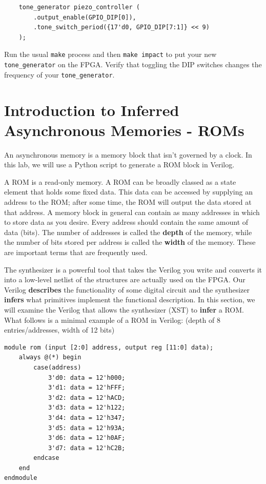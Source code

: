 \documentclass[11pt]{article}
\begin{document}
\begin{verbatim}
	tone_generator piezo_controller (
		.output_enable(GPIO_DIP[0]),
		.tone_switch_period({17'd0, GPIO_DIP[7:1]} << 9)
	);
\end{verbatim}

Run the usual \verb|make| process and then \verb|make impact| to put your new \verb|tone_generator| on the FPGA. Verify that toggling the DIP switches changes the frequency of your \verb|tone_generator|. 

\section{Introduction to Inferred Asynchronous Memories - ROMs}
An asynchronous memory is a memory block that isn't governed by a clock. In this lab, we will use a Python script to generate a ROM block in Verilog.

A ROM is a read-only memory. A ROM can be broadly classed as a state element that holds some fixed data. This data can be accessed by supplying an address to the ROM; after some time, the ROM will output the data stored at that address. A memory block in general can contain as many addresses in which to store data as you desire. Every address should contain the same amount of data (bits). The number of addresses is called the \textbf{depth} of the memory, while the number of bits stored per address is called the \textbf{width} of the memory. These are important terms that are frequently used.

The synthesizer is a powerful tool that takes the Verilog you write and converts it into a low-level netlist of the structures are actually used on the FPGA. Our Verilog \textbf{describes} the functionality of some digital circuit and the synthesizer \textbf{infers} what primitives implement the functional description. In this section, we will examine the Verilog that allows the synthesizer (XST) to \textbf{infer} a ROM. What follows is a minimal example of a ROM in Verilog: (depth of 8 entries/addresses, width of 12 bits)

\begin{verbatim}
module rom (input [2:0] address, output reg [11:0] data);
	always @(*) begin
		case(address)
			3'd0: data = 12'h000;
			3'd1: data = 12'hFFF;
			3'd2: data = 12'hACD;
			3'd3: data = 12'h122;
			3'd4: data = 12'h347;
			3'd5: data = 12'h93A;
			3'd6: data = 12'h0AF;
			3'd7: data = 12'hC2B;
		endcase
	end
endmodule
\end{verbatim}
\end{document}
